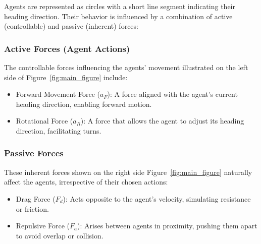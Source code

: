 \documentclass[9pt]{IEEEtran}
\begin{document}
Agents are represented as circles with a short line segment indicating their heading direction. Their behavior is influenced by a combination of active (controllable) and passive (inherent) forces:

\subsubsection{Active Forces (Agent Actions)}
The controllable forces influencing the agents' movement illustrated on the left side of Figure~\ref{fig:main_figure} include: 
\begin{itemize} 
    \item Forward Movement Force ($a_F$): A force aligned with the agent's current heading direction, enabling forward motion. \item Rotational Force ($a_R$): A force that allows the agent to adjust its heading direction, facilitating turns.
\end{itemize}

\subsubsection{Passive Forces}
These inherent forces shown on the right side Figure~\ref{fig:main_figure} naturally affect the agents, irrespective of their chosen actions: 
\begin{itemize} 
    \item Drag Force ($F_d$): Acts opposite to the agent's velocity, simulating resistance or friction. 
    \item Repulsive Force ($F_a$): Arises between agents in proximity, pushing them apart to avoid overlap or collision.
\end{itemize}
\end{document}
